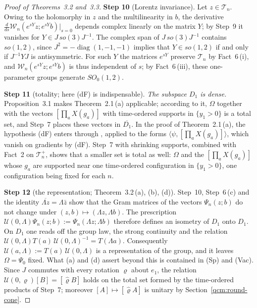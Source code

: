 \documentclass[11pt,letterpaper,reqno]{amsart}
\theoremstyle{definition}
\begin{document}
\begin{proof}[Proof of Theorems~3.2 and~3.3]
\textbf{Step 10} (Lorentz invariance).
Let $z\in\mathcal T_n$.
Owing to the holomorphy in $z$ and the multilinearity in $b$, the derivative $\frac d{ds}\mathcal W_n(e^{sY}z;e^{sY}b)|_{s=0}$ depends complex linearly on the matrix $Y$; by Step~9 it vanishes for $Y\in J\,so(3)J^{-1}$.
The complex span of $J\,so(3)J^{-1}$ contains $so(1,2)$, since $J^2=-\operatorname{diag}(1,-1,-1)$ implies that $Y\in so(1,2)$ if and only if $J^{-1}YJ$ is antisymmetric.
For such $Y$ the matrices $e^{sY}$ preserve $\mathcal T_n$ by Fact~6\,(i), and $\mathcal W_n(e^{sY}z;e^{sY}b)$ is thus independent of $s$; by Fact~6\,(iii), these one-parameter groups generate $SO_0(1,2)$.

\textbf{Step 11} (totality; here (dF) is indispensable).
\emph{The subspace $D_1$ is dense.}
Proposition~3.1 makes Theorem~2.1\,(a) applicable; according to it, $\Omega$ together with the vectors $[\prod_aX(g_a)]$ with time-ordered supports in $\{y_1>0\}$ is a total set, and Step~7 places these vectors in $\overline{D_1}$.
In the proof of Theorem~2.1\,(a), the hypothesis (dF) enters through \cite[Proposition~8.4]{QEDConstruction}, applied to the forms $\langle\psi,[\prod_aX(g_a)]\rangle$, which vanish on gradients by (dF).
Step~7 with shrinking supports, combined with Fact~2 on $\mathcal T_n^+$, shows that a smaller set is total as well: $\Omega$ and the $[\prod_aX(g_a)]$ whose $g_a$ are supported near one time-ordered configuration in $\{y_1>0\}$, one configuration being fixed for each $n$.

\textbf{Step 12} (the representation; Theorem~3.2\,(a), (b), (d)).
Step~10, Step~6\,(c) and the identity $\overline{\Lambda z}=\Lambda\bar z$ show that the Gram matrices of the vectors $\Psi_n(z;b)$ do not change under $(z,b)\mapsto(\Lambda z,\Lambda b)$.
The prescription $\mathcal U(0,\Lambda)\Psi_n(z;b):=\Psi_n(\Lambda z;\Lambda b)$ therefore defines an isometry of $D_1$ onto $D_1$.
On $D_1$ one reads off the group law, the strong continuity and the relation $\mathcal U(0,\allowbreak \Lambda)T(a)\,\allowbreak \mathcal U(0,\allowbreak \Lambda)^{-1}=\allowbreak T(\Lambda a)$.
Consequently $\mathcal U(a,\Lambda):=T(a)\,\mathcal U(0,\Lambda)$ is a representation of the group, and it leaves $\Omega=\Psi_0$ fixed.
What (a) and (d) assert beyond this is contained in (Sp) and (Vac).
Since $J$ commutes with every rotation $\varrho$ about $e_1$, the relation $\mathcal U(0,\varrho)[B]=[\hat\varrho B]$ holds on the total set formed by the time-ordered products of Step~7; moreover $[A]\mapsto[\hat\varrho A]$ is unitary by Section~\ref{qcm:round-cone}.


\end{proof}
\end{document}
